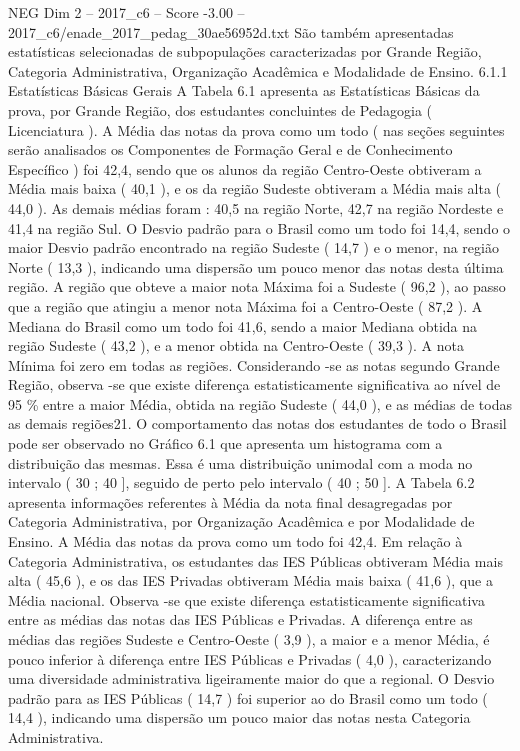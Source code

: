 \begin{textsample}{NEG Dim 2 – 2017\_c6 – Score -3.00 – 2017\_c6/enade\_2017\_pedag\_30ae56952d.txt}
São também apresentadas estatísticas selecionadas de subpopulações caracterizadas por Grande Região, Categoria Administrativa, Organização Acadêmica e Modalidade de Ensino. 6.1.1 Estatísticas Básicas Gerais A Tabela 6.1 apresenta as Estatísticas Básicas da prova, por Grande Região, dos estudantes concluintes de Pedagogia ( Licenciatura ).
A Média das notas da prova como um todo ( nas seções seguintes serão analisados os Componentes de Formação Geral e de Conhecimento Específico ) foi 42,4, sendo que os alunos da região Centro-Oeste obtiveram a Média mais baixa ( 40,1 ), e os da região Sudeste obtiveram a Média mais alta ( 44,0 ).
As demais médias foram : 40,5 na região Norte, 42,7 na região Nordeste e 41,4 na região Sul.
O Desvio padrão para o Brasil como um todo foi 14,4, sendo o maior Desvio padrão encontrado na região Sudeste ( 14,7 ) e o menor, na região Norte ( 13,3 ), indicando uma dispersão um pouco menor das notas desta última região.
A região que obteve a maior nota Máxima foi a Sudeste ( 96,2 ), ao passo que a região que atingiu a menor nota Máxima foi a Centro-Oeste ( 87,2 ).
A Mediana do Brasil como um todo foi 41,6, sendo a maior Mediana obtida na região Sudeste ( 43,2 ), e a menor obtida na Centro-Oeste ( 39,3 ).
A nota Mínima foi zero em todas as regiões.
Considerando -se as notas segundo Grande Região, observa -se que existe diferença estatisticamente significativa ao nível de 95 \% entre a maior Média, obtida na região Sudeste ( 44,0 ), e as médias de todas as demais regiões21.
O comportamento das notas dos estudantes de todo o Brasil pode ser observado no Gráfico 6.1 que apresenta um histograma com a distribuição das mesmas.
Essa é uma distribuição unimodal com a moda no intervalo ( 30 ; 40 ], seguido de perto pelo intervalo ( 40 ; 50 ].
A Tabela 6.2 apresenta informações referentes à Média da nota final desagregadas por Categoria Administrativa, por Organização Acadêmica e por Modalidade de Ensino.
A Média das notas da prova como um todo foi 42,4.
Em relação à Categoria Administrativa, os estudantes das IES Públicas obtiveram Média mais alta ( 45,6 ), e os das IES Privadas obtiveram Média mais baixa ( 41,6 ), que a Média nacional.
Observa -se que existe diferença estatisticamente significativa entre as médias das notas das IES Públicas e Privadas.
A diferença entre as médias das regiões Sudeste e Centro-Oeste ( 3,9 ), a maior e a menor Média, é pouco inferior à diferença entre IES Públicas e Privadas ( 4,0 ), caracterizando uma diversidade administrativa ligeiramente maior do que a regional.
O Desvio padrão para as IES Públicas ( 14,7 ) foi superior ao do Brasil como um todo ( 14,4 ), indicando uma dispersão um pouco maior das notas nesta Categoria Administrativa.

\end{textsample}
